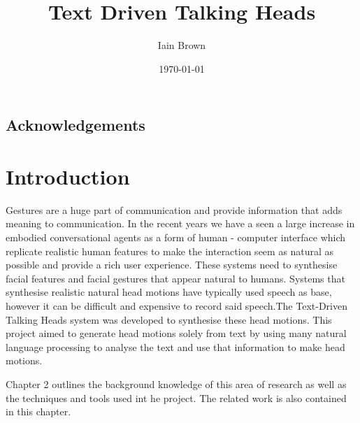 \documentclass[bsc,frontabs,twoside,singlespacing,parskip]{infthesis}
\begin{document}
\title{Text Driven Talking Heads}
\author{Iain Brown}

\date{\today}

\maketitle
\section*{Acknowledgements}
\tableofcontents

\chapter{Introduction}

Gestures are a huge part of communication \cite{kendon} and provide information that adds meaning to communication. In the recent years we have a seen a large increase in embodied conversational agents as a form of human - computer interface which replicate realistic human features to make the interaction seem as natural as possible and provide a rich user experience. These systems need to synthesise facial features and facial gestures that appear natural to humans. Systems that synthesise realistic natural head motions have typically used speech as base, however it can be difficult and expensive to record said speech.The Text-Driven Talking Heads system was developed to synthesise these head motions. This project aimed to generate head motions solely from text by using many natural language processing to analyse the text and use that information to make head motions.

Chapter 2 outlines the background knowledge of this area of research as well as the techniques and tools used int he project. The related work is also contained in this chapter.
\end{document}
